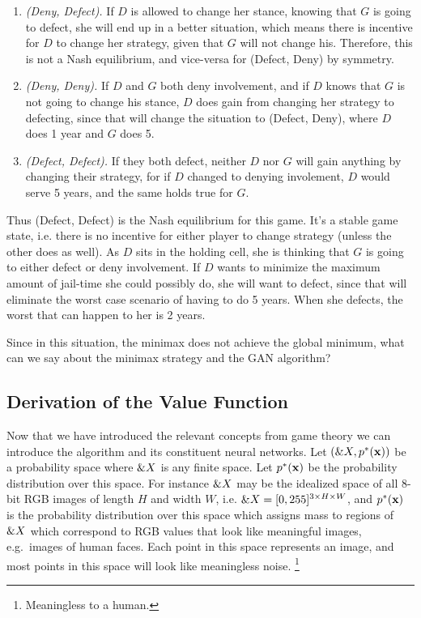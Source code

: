 \begin{enumerate}
\item \textit{(Deny, Defect).} If $D$ is allowed to change her stance,
  knowing that $G$ is going to defect, she will end up in a better
  situation, which means there is incentive for $D$ to change her
  strategy, given that $G$ will not change his. Therefore, this is not
  a Nash equilibrium, and vice-versa for (Defect, Deny) by symmetry.
\item \textit{(Deny, Deny).} If $D$ and $G$ both deny involvement, and
  if $D$ knows that $G$ is not going to change his stance, $D$ does
  gain from changing her strategy to defecting, since that will change
  the situation to (Defect, Deny), where $D$ does 1 year and $G$ does
  5.
\item \textit{(Defect, Defect).} If they both defect, neither $D$ nor
  $G$ will gain anything by changing their strategy, for if $D$
  changed to denying involement, $D$ would serve 5 years, and the same
  holds true for $G$.
\end{enumerate}

Thus (Defect, Defect) is the Nash equilibrium for this game. It's a
stable game state, i.e. there is no incentive for either player to
change strategy (unless the other does as well). As $D$ sits in the
holding cell, she is thinking that $G$ is going to either defect or
deny involvement. If $D$ wants to minimize the maximum amount of
jail-time she could possibly do, she will want to defect, since that
will eliminate the worst case scenario of having to do 5 years. When
she defects, the worst that can happen to her is 2 years.

Since in this situation, the minimax does not achieve the global
minimum, what can we say about the minimax strategy and the GAN
algorithm?

\subsection{Derivation of the Value Function}
\label{sec:derivation}

Now that we have introduced the relevant concepts from game theory we
can introduce the algorithm and its constituent neural networks. Let
$(\&X, p^*(\mathbf{x}))$ be a probability space where $\&X$ is any finite
space. Let $p^*(\mathbf{x})$ be the probability distribution over this space. For
instance $\&X$ may be the idealized space of all 8-bit RGB images
of length $H$ and width $W$, i.e.
$\&X = [0, 255]^{3 \times H \times W}$, and $p^*(\mathbf{x})$ is the
probability distribution over this space which assigns mass to regions
of $\&X$ which correspond to RGB values that look like meaningful
images, e.g.\ images of human faces. Each point in this space
represents an image, and most points in this space will look like
meaningless noise. \footnote{Meaningless to a human.}

